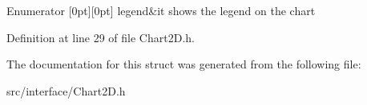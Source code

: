 \begin{DoxyEnumFields}{Enumerator}
[0pt][0pt]{}\mbox{\label{struct_chart2_d_1_1_chart_options_a796006d22e811fc736d9cf4fb38f6b69abe6091aa82c65558fdb1cadaa45aec39}} 
legend&it shows the legend on the chart \\
\hline

\end{DoxyEnumFields}


Definition at line 29 of file Chart2\+D.\+h.



The documentation for this struct was generated from the following file\+:\begin{DoxyCompactItemize}
\item 
src/interface/Chart2\+D.\+h\end{DoxyCompactItemize}
